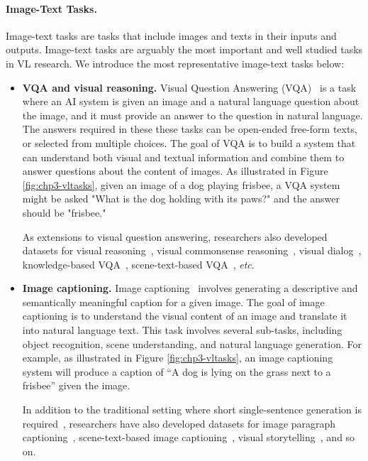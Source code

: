 \paragraph{Image-Text Tasks.} Image-text tasks are tasks that include images and texts in their inputs and outputs. Image-text tasks are arguably the most important and well studied tasks in VL research. We introduce the most representative image-text tasks below:
    \begin{itemize}[leftmargin=*]
        \item \textbf{VQA and visual reasoning.} Visual Question Answering (VQA)~\citep{antol2015vqa} is a task where an AI system is given an image and a natural language question about the image, and it must provide an answer to the question in natural language. The answers required in these these tasks can be open-ended free-form texts, or selected from multiple choices. The goal of VQA is to build a system that can understand both visual and textual information and combine them to answer questions about the content of images. As illustrated in Figure \ref{fig:chp3-vltasks}, given an image of a dog playing frisbee, a VQA system might be asked "What is the dog holding with its paws?" and the answer should be "frisbee."
        
        As extensions to visual question answering, researchers also developed datasets for visual reasoning~\citep{hudson2019gqa,suhr2018corpus}, visual commonsense reasoning~\citep{zellers2019recognition}, visual dialog~\citep{das2017visual},  knowledge-based VQA~\citep{marino2019ok}, scene-text-based VQA~\citep{singh2019towards}, \emph{etc}. 
        
        \item \textbf{Image captioning.} Image captioning~\citep{vinyals2015show} involves generating a descriptive and semantically meaningful caption for a given image. The goal of image captioning is to understand the visual content of an image and translate it into natural language text. This task involves several sub-tasks, including object recognition, scene understanding, and natural language generation. 
        For example, as illustrated in Figure \ref{fig:chp3-vltasks}, an image captioning system will produce a caption of ``A dog is lying on the grass next to a frisbee'' given the image.
        
        In addition to the traditional setting where short single-sentence generation is required~\citep{lin2014microsoft}, researchers have also developed datasets for image paragraph captioning~\citep{krause2017hierarchical}, scene-text-based image captioning~\citep{sidorov2020textcaps}, visual storytelling~\citep{huang2016visual}, and so on. %
        

\end{itemize}
